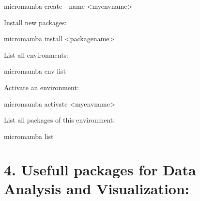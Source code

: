 \documentclass[
  letterpaper,
  DIV=11,
  numbers=noendperiod]{scrreprt}
\newenvironment{Shaded}{\begin{snugshade}}{\end{snugshade}}
\newcommand{\AttributeTok}[1]{\textcolor[rgb]{0.40,0.45,0.13}{#1}}
\newcommand{\ExtensionTok}[1]{\textcolor[rgb]{0.00,0.23,0.31}{#1}}
\newcommand{\NormalTok}[1]{\textcolor[rgb]{0.00,0.23,0.31}{#1}}
\newcommand{\OperatorTok}[1]{\textcolor[rgb]{0.37,0.37,0.37}{#1}}
\begin{document}
\begin{Shaded}
\begin{Highlighting}[]
\ExtensionTok{micromamba}\NormalTok{ create }\AttributeTok{{-}{-}name} \OperatorTok{\textless{}}\NormalTok{myenvname}\OperatorTok{\textgreater{}}
\end{Highlighting}
\end{Shaded}

Install new packages:

\begin{Shaded}
\begin{Highlighting}[]
\ExtensionTok{micromamba}\NormalTok{ install }\OperatorTok{\textless{}}\NormalTok{packagename}\OperatorTok{\textgreater{}}
\end{Highlighting}
\end{Shaded}

List all environments:

\begin{Shaded}
\begin{Highlighting}[]
\ExtensionTok{micromamba}\NormalTok{ env list}
\end{Highlighting}
\end{Shaded}

Activate an environment:

\begin{Shaded}
\begin{Highlighting}[]
\ExtensionTok{micromamba}\NormalTok{ activate }\OperatorTok{\textless{}}\NormalTok{myenvname}\OperatorTok{\textgreater{}}
\end{Highlighting}
\end{Shaded}

List all packages of this environment:

\begin{Shaded}
\begin{Highlighting}[]
\ExtensionTok{micromamba}\NormalTok{ list}
\end{Highlighting}
\end{Shaded}

\section*{4. Usefull packages for Data Analysis and
Visualization:}\label{usefull-packages-for-data-analysis-and-visualization}

\end{document}
